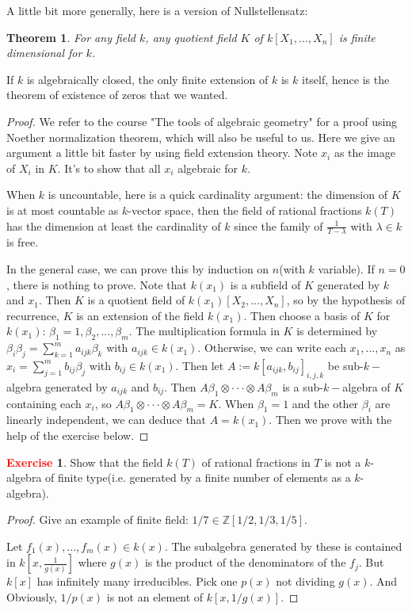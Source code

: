 \documentclass[12pt,a4paper,english]{article}
\theoremstyle{plain}
\newtheorem{thm}{Theorem}[section]
\theoremstyle{definition}
\newtheorem{exercise}{\textbf{\textcolor{red}{Exercise}}}
\theoremstyle{remark}
\begin{document}
A little bit more generally, here is a version of Nullstellensatz:
\begin{thm}
For any field $k$, any quotient field $K$ of $k[X_{1},...,X_{n}]$ is finite dimensional for $k$.
\end{thm}
If $k$ is algebraically closed, the only finite extension of $k$ is $k$ itself, hence is the theorem of existence of zeros that we wanted.
\begin{proof}
We refer to the course "The tools of algebraic geometry" for a proof using Noether normalization theorem, which will also be useful to us. Here we give an argument a little bit faster by using field extension theory. Note $x_{i}$ as the image of $X_{i}$ in $K$. It's to show that all $x_{i}$ algebraic for $k$.

When $k$ is uncountable, here is a quick cardinality argument: the dimension of $K$
is at most countable as $k$-vector space, then the field of rational fractions $k(T)$ has the dimension at least the cardinality of $k$ since the family of $\frac{1}{T-\lambda}$ with $\lambda\in k$ is free.

In the general case, we can prove this by induction on $n$(with $k$ variable). If $n=0$, there is nothing to prove. Note that $k(x_{1})$ is a subfield of $K$ generated by $k$ and $x_{1}$. Then $K$ is a quotient field of $k(x_{1})[X_{2},...,X_{n}]$, so by the hypothesis of recurrence, $K$ is an extension of the field $k(x_{1})$. Then choose a basis of $K$ for $k(x_{1})$: $\beta_{1}=1, \beta_{2},...,\beta_{m}$. The multiplication formula in $K$ is determined by $\beta_{i}\beta_{j}=\sum_{k=1}^{m}a_{ijk}\beta_{k}$ with $a_{ijk}\in k(x_{1})$. Otherwise, we can write each $x_{1},...,x_{n}$ as  $x_{i}=\sum_{j=1}^{m}b_{ij}\beta_{j}$ with $b_{ij}\in k(x_{1})$. Then let $A:=k[a_{ijk},b_{ij}]_{i,j,k}$ be sub-$k-$algebra generated by $a_{ijk}$ and $b_{ij}$. Then $A\beta_{1}\otimes\cdot\cdot\cdot\otimes A\beta_{m} $ is a sub-$k-$algebra of $K$ containing each $x_{i}$, so $A\beta_{1}\otimes\cdot\cdot\cdot\otimes A\beta_{m}=K$. When $\beta_{1}=1$ and the other $\beta_{i}$ are linearly independent, we can deduce that $A=k(x_{1})$. Then we prove with the help of the exercise below.
\end{proof}
\begin{exercise}
Show that the field $k(T)$ of rational fractions in $T$ is not a $k$-algebra of finite type(i.e. generated by a finite number of elements as a $k$-algebra).
\end{exercise}
\begin{tcolorbox}
\begin{proof}
Give an example of finite field: $1/7\in \mathbb{Z}[1/2,1/3,1/5]$.

Let $f_{1}(x),...,f_{m}(x)\in k(x)$. The subalgebra generated by these is contained in $k[x, \frac{1}{g(x)}]$ where $g(x)$ is the product of the denominators of the $f_{j}$. But $k[x]$ has infinitely many irreducibles. Pick one $p(x)$ not dividing $g(x)$. And Obviously, $1/p(x)$ is not an element of $k[x,1/g(x)]$.  
\end{proof}
\end{tcolorbox}
\end{document}
